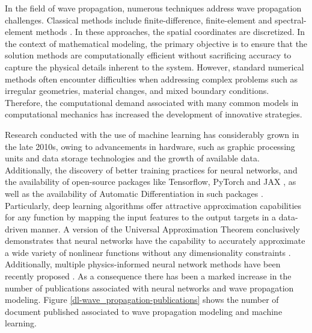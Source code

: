 \documentclass[11pt,twoside]{article}
\begin{document}
In the field of wave propagation, numerous techniques address wave propagation challenges. Classical methods include finite-difference, 
finite-element and spectral-element methods \citep{Moczo, virieux_review_2011, Igel2017,komatitsch_introduction_1999,
chaljub_spectral-element_2007}. In these approaches, the spatial coordinates are discretized. 
In the context of mathematical modeling, the primary objective is to ensure that the solution methods 
are computationally efficient without sacrificing accuracy to capture the physical details inherent to the 
system. However, standard numerical methods often encounter difficulties when addressing complex problems such as irregular 
geometries, material changes, and mixed boundary conditions. Therefore, the computational demand associated with many common models 
in computational mechanics has increased the development of innovative strategies.

Research conducted with the use of machine learning has considerably grown in the late 2010s, owing to advancements in hardware, such 
as graphic processing units and data storage technologies and the growth of available data. Additionally, the discovery of better training 
practices for neural networks, and the availability of open-source packages like Tensorflow, PyTorch and 
JAX \citep{abadi_tensorflow_2016,paszke_pytorch_2019,jax2018github}, as well as the availability of Automatic Differentiation in such 
packages \citep{paszke_automatic_2017,baydin_automatic_2017}. Particularly, deep learning algorithms offer attractive approximation 
capabilities for any function by mapping the input features to the output targets in a data-driven manner. A version of the Universal 
Approximation Theorem conclusively demonstrates that neural networks have the capability to accurately approximate a wide variety of 
nonlinear functions without any dimensionality constraints \citep{barron_universal_1993}. Additionally, multiple physics-informed neural 
network methods have been recently proposed \citep{cuomo_scientific_2022}. As a consequence there has been a marked increase in the number 
of publications associated with neural networks and wave propagation modeling. Figure \ref{dl-wave_propagation-publications} shows the 
number of document published associated to wave propagation modeling and machine learning. 
\end{document}
